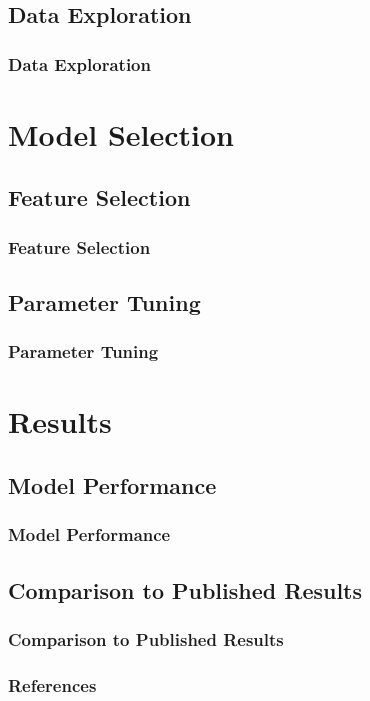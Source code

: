 \documentclass{beamer}
\begin{document}
\subsection{Data Exploration}
\begin{frame}[t]
\frametitle{Data Exploration}
\end{frame}

\section{Model Selection}

\subsection{Feature Selection}
\begin{frame}[t]
\frametitle{Feature Selection}
\end{frame}

\subsection{Parameter Tuning}
\begin{frame}[t]
\frametitle{Parameter Tuning}
\end{frame}

\section{Results}

\subsection{Model Performance}
\begin{frame}[t]
\frametitle{Model Performance}
\end{frame}

\subsection{Comparison to Published Results}
\begin{frame}[t]
\frametitle{Comparison to Published Results}
\end{frame}

\begin{frame}[t]
\frametitle{References}
\printbibliography
\end{frame}
\end{document}
